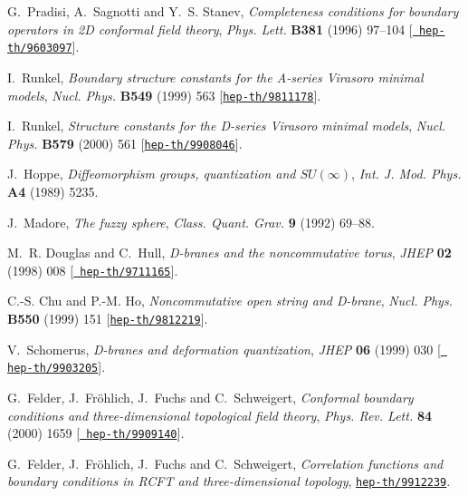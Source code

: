 \documentclass[12pt,a4paper]{article}
\begin{document}
\begin{thebibliography}{10}
G.~Pradisi, A.~Sagnotti and Y.~S. Stanev, {\it Completeness conditions for
  boundary operators in {2D} conformal field theory},  {\em Phys. Lett.} {\bf
  B381} (1996) 97--104 [\href{http://arXiv.org/abs/hep-th/9603097}{{\tt
  hep-th/9603097}}].

I.~Runkel, {\it Boundary structure constants for the {A-series} {Virasoro}
  minimal models},  {\em Nucl. Phys.} {\bf B549} (1999) 563
  [\href{http://arXiv.org/abs/hep-th/9811178}{{\tt hep-th/9811178}}].

I.~Runkel, {\it Structure constants for the {D-series} {Virasoro} minimal
  models},  {\em Nucl. Phys.} {\bf B579} (2000) 561
  [\href{http://arXiv.org/abs/hep-th/9908046}{{\tt hep-th/9908046}}].

J.~Hoppe, {\it Diffeomorphism groups, quantization and {$SU(\infty)$}},  {\em
  Int. J. Mod. Phys.} {\bf A4} (1989) 5235.

J.~Madore, {\it The fuzzy sphere},  {\em Class. Quant. Grav.} {\bf 9} (1992)
  69--88.

M.~R. Douglas and C.~Hull, {\it D-branes and the noncommutative torus},  {\em
  JHEP} {\bf 02} (1998) 008 [\href{http://arXiv.org/abs/hep-th/9711165}{{\tt
  hep-th/9711165}}].

C.-S. Chu and P.-M. Ho, {\it Noncommutative open string and {D-brane}},  {\em
  Nucl. Phys.} {\bf B550} (1999) 151
  [\href{http://arXiv.org/abs/hep-th/9812219}{{\tt hep-th/9812219}}].

V.~Schomerus, {\it D-branes and deformation quantization},  {\em JHEP} {\bf 06}
  (1999) 030 [\href{http://arXiv.org/abs/hep-th/9903205}{{\tt
  hep-th/9903205}}].

G.~Felder, J.~{Fr\"ohlich}, J.~Fuchs and C.~Schweigert, {\it Conformal boundary
  conditions and three-dimensional topological field theory},  {\em Phys. Rev.
  Lett.} {\bf 84} (2000) 1659 [\href{http://arXiv.org/abs/hep-th/9909140}{{\tt
  hep-th/9909140}}].

G.~Felder, J.~{Fr\"ohlich}, J.~Fuchs and C.~Schweigert, {\it Correlation
  functions and boundary conditions in {RCFT} and three-dimensional topology},
  \href{http://arXiv.org/abs/hep-th/9912239}{{\tt hep-th/9912239}}.


\end{thebibliography}
\end{document}
